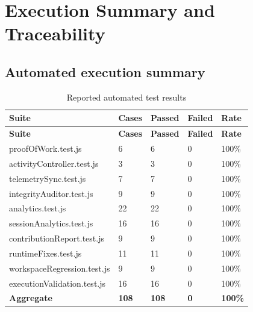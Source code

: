 \documentclass[11pt,a4paper]{article}
\newcommand{\tableheader}[1]{\textbf{#1}}
\begin{document}
\section{Execution Summary and Traceability}

\subsection{Automated execution summary}
\scriptsize
\begin{xltabular}{\textwidth}{Y C{1.5cm} C{1.5cm} C{1.5cm} C{2.0cm}}
\caption{Reported automated test results}\label{tab:summary}\\
\toprule
{}
\tableheader{Suite} & \tableheader{Cases} & \tableheader{Passed} & \tableheader{Failed} & \tableheader{Rate}\\
\midrule
\endfirsthead
\toprule
{}
\tableheader{Suite} & \tableheader{Cases} & \tableheader{Passed} & \tableheader{Failed} & \tableheader{Rate}\\
\midrule
\endhead
proofOfWork.test.js & 6 & 6 & 0 & 100\%\\
activityController.test.js & 3 & 3 & 0 & 100\%\\
telemetrySync.test.js & 7 & 7 & 0 & 100\%\\
integrityAuditor.test.js & 9 & 9 & 0 & 100\%\\
analytics.test.js & 22 & 22 & 0 & 100\%\\
sessionAnalytics.test.js & 16 & 16 & 0 & 100\%\\
contributionReport.test.js & 9 & 9 & 0 & 100\%\\
runtimeFixes.test.js & 11 & 11 & 0 & 100\%\\
workspaceRegression.test.js & 9 & 9 & 0 & 100\%\\
executionValidation.test.js & 16 & 16 & 0 & 100\%\\
\textbf{Aggregate} & \textbf{108} & \textbf{108} & \textbf{0} & \textbf{100\%}\\
\bottomrule
\end{xltabular}
\normalsize
\end{document}
